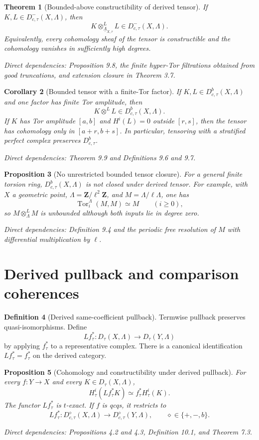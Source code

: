 \documentclass[10pt]{article}
\newtheorem{theorem}{Theorem}[section]
\newtheorem{proposition}[theorem]{Proposition}
\newtheorem{corollary}[theorem]{Corollary}
\theoremstyle{definition}
\newtheorem{definition}[theorem]{Definition}
\newcommand{\Lam}{\Lambda}
\newcommand{\DbcAt}[1]{D^b_{c,#1}}
\newcommand{\Tor}{\operatorname{Tor}}
\newcommand{\dep}[1]{\par\smallskip\noindent\textit{Direct dependencies: #1}}
\begin{document}
\begin{theorem}[Bounded-above constructibility of derived tensor]
If $K,L\in D^-_{c,\tau}(X,\Lam)$, then
\[
K\otimes^L_{\underline\Lam_{X,\tau}}L
\in D^-_{c,\tau}(X,\Lam).
\]
Equivalently, every cohomology sheaf of the tensor is constructible and the
cohomology vanishes in sufficiently high degrees.
\dep{Proposition 9.8, the finite hyper-Tor filtrations obtained from good
truncations, and extension closure in Theorem 3.7.}
\end{theorem}

\begin{corollary}[Bounded tensor with a finite-Tor factor]
If $K,L\in\DbcAt{\tau}(X,\Lam)$ and one factor has finite Tor amplitude, then
\[
K\otimes^LL\in\DbcAt{\tau}(X,\Lam).
\]
If $K$ has Tor amplitude $[a,b]$ and $H^i(L)=0$ outside $[r,s]$, then the tensor
has cohomology only in $[a+r,b+s]$.  In particular, tensoring with a
stratified perfect complex preserves $\DbcAt{\tau}$.
\dep{Theorem 9.9 and Definitions 9.6 and 9.7.}
\end{corollary}

\begin{proposition}[No unrestricted bounded tensor closure]
For a general finite torsion ring, $\DbcAt{\tau}(X,\Lam)$ is not closed under
derived tensor.  For example, with $X$ a geometric point,
$\Lam=\mathbf Z/\ell^2\mathbf Z$, and $M=\Lam/\ell\Lam$, one has
\[
\Tor_i^\Lam(M,M)\simeq M\qquad(i\ge0),
\]
so $M\otimes^L_\Lam M$ is unbounded although both inputs lie in degree zero.
\dep{Definition 9.4 and the periodic free resolution of $M$ with differential
multiplication by $\ell$.}
\end{proposition}

\section{Derived pullback and comparison coherences}

\begin{definition}[Derived same-coefficient pullback]
Termwise pullback preserves quasi-isomorphisms.  Define
\[
Lf_\tau^*:D_\tau(X,\Lam)\longrightarrow D_\tau(Y,\Lam)
\]
by applying $f_\tau^*$ to a representative complex.  There is a canonical
identification $Lf_\tau^*=f_\tau^*$ on the derived category.
\end{definition}

\begin{proposition}[Cohomology and constructibility under derived pullback]
For every $f:Y\to X$ and every $K\in D_\tau(X,\Lam)$,
\[
H^i_\tau(Lf_\tau^*K)\simeq f_\tau^*H^i_\tau(K).
\]
The functor $Lf_\tau^*$ is $t$-exact.  If $f$ is qcqs, it restricts to
\[
Lf_\tau^*:D^\diamond_{c,\tau}(X,\Lam)
\longrightarrow D^\diamond_{c,\tau}(Y,\Lam),
\qquad \diamond\in\{+,-,b\}.
\]
\dep{Propositions 4.2 and 4.3, Definition 10.1, and Theorem 7.3.}
\end{proposition}
\end{document}
